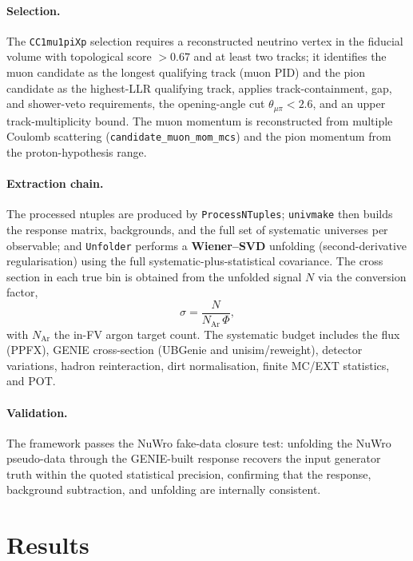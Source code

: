 \documentclass[11pt]{article}
\begin{document}
\paragraph{Selection.}
The \texttt{CC1mu1piXp} selection requires a reconstructed neutrino vertex in the
fiducial volume with topological score $>0.67$ and at least two tracks; it
identifies the muon candidate as the longest qualifying track (muon PID) and the
pion candidate as the highest-LLR qualifying track, applies track-containment,
gap, and shower-veto requirements, the opening-angle cut $\theta_{\mu\pi}<2.6$,
and an upper track-multiplicity bound. The muon momentum is reconstructed from
multiple Coulomb scattering (\texttt{candidate\_muon\_mom\_mcs}) and the pion
momentum from the proton-hypothesis range.

\paragraph{Extraction chain.}
The processed ntuples are produced by \texttt{ProcessNTuples}; \texttt{univmake}
then builds the response matrix, backgrounds, and the full set of systematic
universes per observable; and \texttt{Unfolder} performs a \textbf{Wiener--SVD}
unfolding (second-derivative regularisation) using the full
systematic-plus-statistical covariance. The cross section in each true bin is
obtained from the unfolded signal $N$ via the conversion factor,
\begin{equation}
  \sigma = \frac{N}{N_{\mathrm{Ar}}\,\Phi},
\end{equation}
with $N_{\mathrm{Ar}}$ the in-FV argon target count. The systematic budget
includes the flux (PPFX), GENIE cross-section (UBGenie and unisim/reweight),
detector variations, hadron reinteraction, dirt normalisation, finite MC/EXT
statistics, and POT.

\paragraph{Validation.}
The framework passes the NuWro fake-data closure test: unfolding the NuWro
pseudo-data through the GENIE-built response recovers the input generator truth
within the quoted statistical precision, confirming that the response,
background subtraction, and unfolding are internally consistent.

\section{Results}
\label{sec:results}
\end{document}
